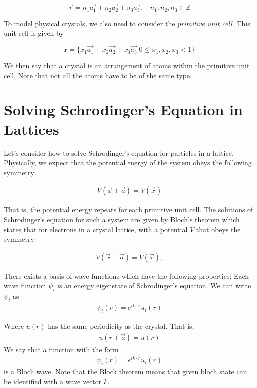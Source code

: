 \documentclass[book.tex]{subfiles}
\begin{document}
\[ \vec{r} = n_1 \vec{a_1} + n_2 \vec{a_2} + n_3 \vec{a_3}, \quad n_1, n_2, n_3 \in \mathbb{Z} \]

To model physical crystals, we also need to consider the \textit{primitive unit cell}. This unit cell is given by

\[ \textbf{r} = \{x_1 \vec{a_1} + x_2 \vec{a_2} + x_3 \vec{a_3} | 0 \leq x_1, x_2, x_3 < 1 \} \]

We then say that a crystal is an arrangement of atoms within the primitive unit cell. Note that not all the atoms have to be of the same type.

\section{Solving Schrodinger's Equation in Lattices}

Let's consider how to solve Schrodinger's equation for particles in a lattice.  Physically, we expect that the potential energy of the system obeys the following symmetry

\begin{align} 
V(\vec{x} + \vec{a}) = V(\vec{x}) 
\end{align}

That is, the potential energy repeats for each primitive unit cell. The solutions of Schrodinger's equation for such a system are given by Bloch's theorem which states that for electrons in a crystal lattice, with a potential $V$ that obeys the symmetry 

\begin{align} 
V(\vec{x} + \vec{a}) = V(\vec{x}), 
\end{align}

There exists a basis of wave functions which have the following properties: Each wave function $\psi_i$ is an energy eigenstate of Schrodinger's equation. We can write $\psi_i$ as 
\begin{align} 
\psi_i(r) = e^{i k \cdot r} u_i(r)
\end{align}
    
Where $u(r)$ has the same periodicity as the crystal. That is, 
\begin{align}
u(r + \vec{a}) = u(r)
\end{align}
We say that a function with the form
\begin{align}
\psi_{i}(r) = e^{ik\cdot r}u_{i}(r)
\end{align}
is a Bloch wave. Note that the Block theorem means that given bloch state can be identified with a wave vector $k$.
\end{document}
